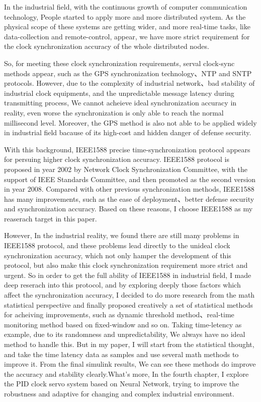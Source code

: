 \begin{englishabstract}

In the industrial field, with the continuous growth of computer communication technology, People started to apply more and more distributed system. As the physical scope of these systems are getting wider, and more real-time tasks, like data-collection and remote-control, appear, we have more strict requirement for the clock synchronization accuracy of the whole distributed nodes.

So, for meeting these clock synchronization requirements, serval clock-sync methods appear, such as the GPS synchronization technology、NTP and SNTP protocols. However, due to the complexity of industrial network、bad stability of industrial clock equipments, and the unpredictable message latency during transmitting process, We cannot acheieve ideal synchronization accuracy in reality, even worse the synchronization is only able to reach the normal millisecond level. Moreover, the GPS method is also not able to be applied widely in industrial field bacause of its high-cost and hidden danger of defense security.

With this background, IEEE1588 precise time-synchronization protocol appears for persuing higher clock synchronization accuracy. IEEE1588 protocol is proposed in year 2002 by Network Clock Synchronization Committee, with the support of IEEE Standards Committee, and then promoted as the second version in year 2008. Compared with other previous synchronization methods, IEEE1588 has many improvements, such as the ease of deployment、better defense security and synchronization accuracy. Based on these reasons, I choose IEEE1588 as my reaserach target in this paper.

However, In the industrial reality, we found there are still many problems in IEEE1588 protocol, and these problems lead directly to the unideal clock synchronization accuracy, which not only hamper the development of this protocol, but also make this clock synchronization requirement more strict and urgent. So in order to get the full ability of IEEE1588 in industrial field, I made deep reserach into this protocol, and by exploring deeply those factors which affect the synchronization accuracy, I decided to do more research from the math statistical perspective and finally proposed creatively a set of statistical methods for acheiving improvements, such as dynamic threshold method、real-time monitoring method based on fixed-window and so on. Taking time-letency as example, due to its randomness and unpredictability, We always have no ideal method to handle this. But in my paper, I will start from the statistical thought, and take the time latency data as samples and use several math methods to improve it. From the final simulink results, We can see these methods do improve the accuracy and stability clearly.What's more, In the fourth chapter, I explore the PID clock servo system based on Neural Network, trying to improve the robustness and adaptive for changing and complex industrial environment.


\end{englishabstract}
